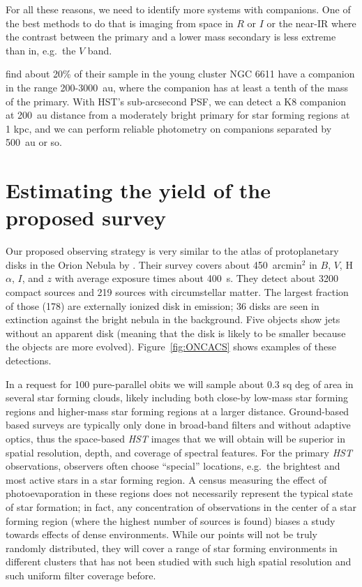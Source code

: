 \documentclass[12pt]{article}
\begin{document}
For all these reasons, we need to identify more systems with companions. One of
the best methods to do that is imaging from space in $R$ or $I$ or the near-IR where the contrast between the primary and a lower mass secondary is less extreme than in, e.g.\ the $V$ band. 

\citet{2001A&A...379..147D} find about 20\% of their sample in the young
cluster NGC 6611 have a companion in the range 200-3000~au, where the companion
has at least a tenth of the mass of the primary. With HST's sub-arcsecond PSF,
we can detect a K8 companion at 200~au distance from a moderately bright
primary for star forming regions at 1 kpc, and we can perform reliable photometry on companions separated by 500~au or so. 


\section{Estimating the yield of the proposed survey}
Our proposed observing strategy is very similar to the atlas of protoplanetary disks in the Orion Nebula by \citet{2008AJ....136.2136R}. Their survey covers about 450~arcmin$^2$ in $B$, $V$, H$\alpha$, $I$, and $z$ with average exposure times about 400~s. They detect about 3200 compact sources and 219 sources with circumstellar matter. The largest fraction of those (178) are externally ionized disk in emission; 36 disks are seen in extinction against the bright nebula in the background. Five objects show jets without an apparent disk (meaning that the disk is likely to be smaller because the objects are more evolved). Figure~\ref{fig:ONCACS} shows examples of these detections. 

In a request for 100 pure-parallel obits we will sample about 0.3 sq deg of
area in several star forming clouds, likely including both close-by low-mass
star forming regions and higher-mass star forming regions at a larger distance.
 Ground-based based surveys are typically only done in broad-band
filters \citep[IPHAS, which also includes an H$\alpha$ filter is an
  exception]{2005MNRAS.362..753D} and without adaptive optics, thus the
space-based \emph{HST} images that we will obtain will be superior in spatial
resolution, depth, and coverage of spectral features. For the primary
\emph{HST} observations, observers often choose ``special'' locations,
e.g.\ the brightest and most active stars in a star forming region. A census
measuring the effect of photoevaporation in these regions does not necessarily
represent the typical state of star formation; in fact, any concentration of
observations in the center of a star forming region (where the highest number
of sources is found) biases a study towards effects of dense
environments. While our points will not be truly randomly distributed, they
will cover a range of star forming environments in different clusters that has
not been studied with such high spatial resolution and such uniform filter
coverage before.
\end{document}
